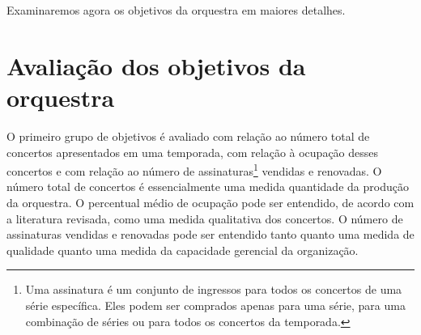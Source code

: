 \documentclass[a4paper, 12pt, openright, oneside, german, french, english, brazil]{abntex2}
\begin{document}
	Examinaremos agora os objetivos da orquestra em maiores detalhes.
	
	\section{Avaliação dos objetivos da orquestra}
	
	
	O primeiro grupo de objetivos é avaliado com relação ao número total de concertos apresentados em uma temporada, com relação à ocupação desses concertos e com relação ao número de assinaturas\footnote{Uma assinatura é um conjunto de ingressos para todos os concertos de uma série específica. Eles podem ser comprados apenas para uma série, para uma combinação de séries ou para todos os concertos da temporada.} vendidas e renovadas. O número total de concertos é essencialmente uma medida quantidade da produção da orquestra. O percentual médio de ocupação pode ser entendido, de acordo com a literatura revisada, como uma medida qualitativa dos concertos. O número de assinaturas vendidas e renovadas pode ser entendido tanto quanto uma medida de qualidade quanto uma medida da capacidade gerencial da organização.
	
	
\end{document}
